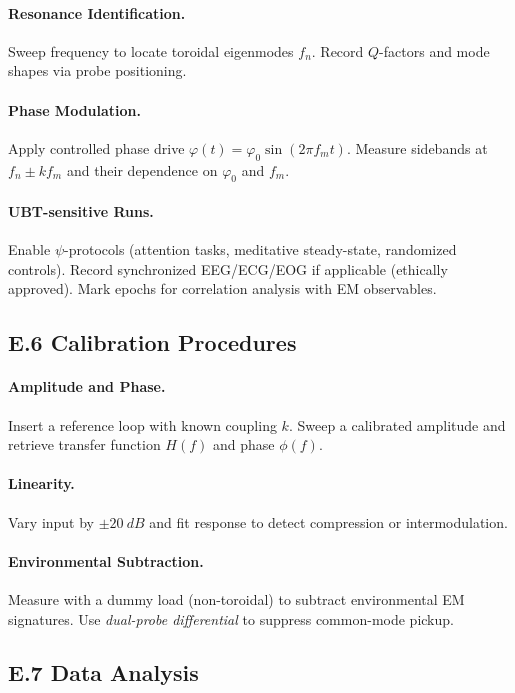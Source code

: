 \paragraph{Resonance Identification.}
Sweep frequency to locate toroidal eigenmodes $f_n$.
Record $Q$-factors and mode shapes via probe positioning.

\paragraph{Phase Modulation.}
Apply controlled phase drive $\varphi(t)=\varphi_0 \sin(2\pi f_m t)$.
Measure sidebands at $f_n \pm k f_m$ and their dependence on $\varphi_0$ and $f_m$.

\paragraph{UBT-sensitive Runs.}
Enable $\psi$-protocols (attention tasks, meditative steady-state, randomized controls). 
Record synchronized EEG/ECG/EOG if applicable (ethically approved).
Mark epochs for correlation analysis with EM observables.

\subsection*{E.6 Calibration Procedures}
\paragraph{Amplitude and Phase.}
Insert a reference loop with known coupling $k$.
Sweep a calibrated amplitude and retrieve transfer function $H(f)$ and phase $\phi(f)$.

\paragraph{Linearity.}
Vary input by $\pm\SI{20}{dB}$ and fit response to detect compression or intermodulation.

\paragraph{Environmental Subtraction.}
Measure with a dummy load (non-toroidal) to subtract environmental EM signatures.
Use \emph{dual-probe differential} to suppress common-mode pickup.

\subsection*{E.7 Data Analysis}
